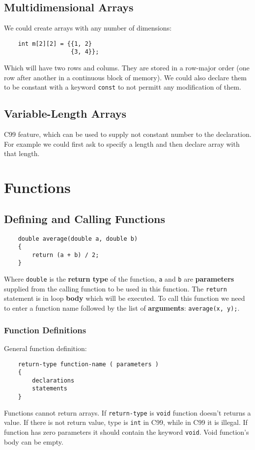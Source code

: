 \documentclass[openany]{book}
\begin{document}
    \section{Multidimensional Arrays}
    We could create arrays with any number of dimensions:
    \begin{lstlisting}
    int m[2][2] = {{1, 2}
                   {3, 4}};
    \end{lstlisting}
    Which will have two rows and colums. They are stored in a row-major order (one row after another
    in a continuous block of memory). We could also declare them to be constant with a keyword
    \texttt{const} to not permitt any modification of them.

    \section{Variable-Length Arrays}
    C99 feature, which can be used to supply not constant number to the declaration. For example we could first ask to specify a length and then declare array with that length.

    \chapter{Functions}

    \section{Defining and Calling Functions}
    \begin{lstlisting}
    double average(double a, double b)
    {
        return (a + b) / 2;
    }
    \end{lstlisting}
    Where \texttt{double} is the \textbf{return type} of the function, \texttt{a} and \texttt{b}
    are \textbf{parameters} supplied from the calling function to be used in this function. The
    \texttt{return} statement is in loop \textbf{body} which will be executed. To call this
    function we need to enter a function name followed by the list of \textbf{arguments}:
    \texttt{average(x, y);}.

    \subsection{Function Definitions}
    General function definition:
    \begin{lstlisting}
    return-type function-name ( parameters )
    {
        declarations
        statements
    }
    \end{lstlisting}
    Functions cannot return arrays. If \texttt{return-type} is \texttt{void} function doesn't returns a value.
    If there is not return value, type is \texttt{int} in C99, while in C99 it is illegal. If function has
    zero parameters it should contain the keyword \texttt{void}. Void function's body can be empty.
\end{document}
